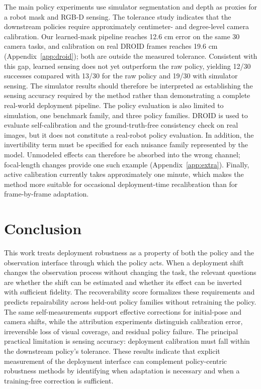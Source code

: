 \documentclass{article}
\begin{document}
The main policy experiments use simulator segmentation and depth as proxies for a robot mask and RGB-D sensing. The
tolerance study indicates that the downstream policies require approximately centimeter- and degree-level camera
calibration. Our learned-mask pipeline reaches 12.6 cm error on the same 30 camera tasks, and calibration on real DROID
frames reaches 19.6 cm (Appendix~\ref{app:droid}); both are outside the measured tolerance. Consistent with this gap,
learned sensing does not yet outperform the raw policy, yielding 12/30 successes compared with 13/30 for the raw policy
and 19/30 with simulator sensing. The simulator results should therefore be interpreted as establishing the sensing
accuracy required by the method rather than demonstrating a complete real-world deployment pipeline.
The policy evaluation is also limited to simulation, one benchmark family, and three policy families. DROID is used to
evaluate self-calibration and the ground-truth-free consistency check on real images, but it does not constitute a
real-robot policy evaluation. In addition, the invertibility term must be specified for each nuisance family represented
by the model. Unmodeled effects can therefore be absorbed into the wrong channel; focal-length changes provide one such
example (Appendix~\ref{app:extra}). Finally, active calibration currently takes approximately one minute, which makes
the method more suitable for occasional deployment-time recalibration than for frame-by-frame adaptation.

\section{Conclusion}

This work treats deployment robustness as a property of both the policy and the observation interface through which the
policy acts. When a deployment shift changes the observation process without changing the task, the relevant questions
are whether the shift can be estimated and whether its effect can be inverted with sufficient fidelity. The
recoverability score formalizes these requirements and predicts repairability across held-out policy families without
retraining the policy. The same self-measurements support effective corrections for initial-pose and camera shifts,
while the attribution experiments distinguish calibration error, irreversible loss of visual coverage, and residual
policy failure. The principal practical limitation is sensing accuracy: deployment calibration must fall within the
downstream policy's tolerance. These results indicate that explicit measurement of the deployment interface can
complement policy-centric robustness methods by identifying when adaptation is necessary and when a training-free
correction is sufficient.
\end{document}
